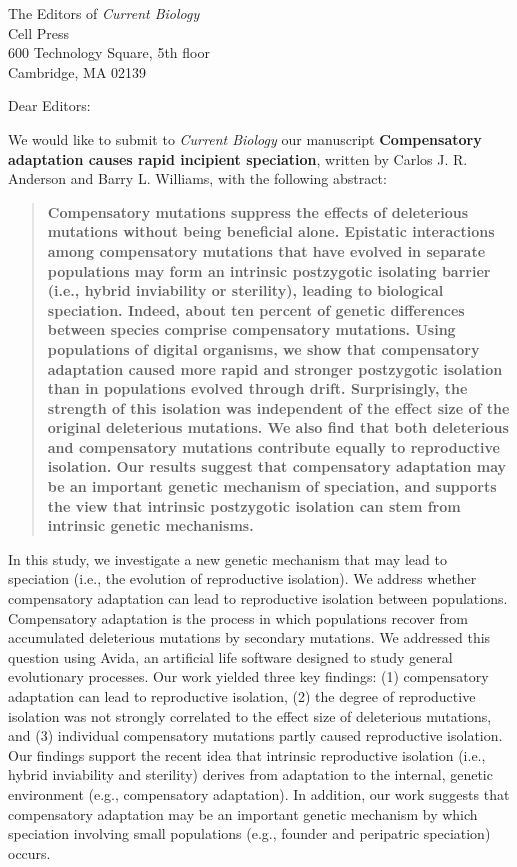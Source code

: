 \documentclass[12pt]{letter}
\begin{document}
\begin{letter}{The Editors of \emph{Current Biology} \\
  Cell Press \\
  600 Technology Square, 5th floor \\
  Cambridge, MA 02139}

\opening{Dear Editors:}

We would like to submit to \emph{Current Biology} our manuscript
\textbf{Compensatory adaptation causes rapid incipient speciation},
written by Carlos J. R. Anderson and Barry L. Williams,
with the following abstract:



\begin{quote}
{\small\textbf{%
Compensatory mutations suppress the effects of deleterious mutations
without being beneficial alone.
%
Epistatic interactions among compensatory mutations that have
evolved in separate populations may form an intrinsic
postzygotic isolating barrier (i.e., hybrid inviability or sterility),
leading to biological speciation.
%
Indeed, about ten percent of genetic differences between species
comprise compensatory mutations.
%
Using populations of digital organisms, we show that
compensatory adaptation caused more rapid and stronger
postzygotic isolation than in populations evolved through drift.
%
Surprisingly, the strength of this isolation was independent
of the effect size of the original deleterious mutations.
%
We also find that both deleterious and compensatory mutations
contribute equally to reproductive isolation.
%
Our results suggest that compensatory adaptation may be
an important genetic mechanism of speciation,
and supports the view that intrinsic postzygotic isolation
can stem from intrinsic genetic mechanisms.
}}
\end{quote}



In this study, we investigate a new genetic mechanism
that may lead to speciation (i.e., the evolution of reproductive isolation).
%
We address whether compensatory adaptation
can lead to reproductive isolation between populations.
%
Compensatory adaptation is the process in which populations recover
from accumulated deleterious mutations by secondary mutations.
%
We addressed this question using Avida, an artificial life software
designed to study general evolutionary processes.
%
Our work yielded three key findings:
(1) compensatory adaptation can lead to reproductive isolation,
(2) the degree of reproductive isolation was not strongly correlated
to the effect size of deleterious mutations, and
(3) individual compensatory mutations partly caused reproductive isolation.
%
Our findings support the recent idea that intrinsic reproductive isolation
(i.e., hybrid inviability and sterility) derives from adaptation
to the internal, genetic environment (e.g., compensatory adaptation).
%
In addition, our work suggests that compensatory adaptation
may be an important genetic mechanism by which speciation
involving small populations (e.g., founder and peripatric speciation) occurs.




\end{letter}
\end{document}
